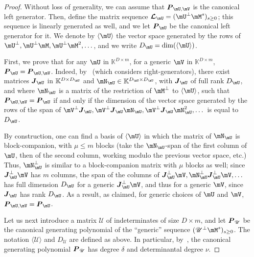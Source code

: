 \documentclass[12pt]{article}
\newcommand{\mat}[1]{\bm{\MakeUppercase{#1}}} %
\newcommand{\seqL}{\mat{\mathcal{L}}} %
\def\K{\mathbb{K}}
\def\K {\ensuremath{\mathbb{K}}}
\def\scrU {\ensuremath{\mathscr{U}}}
\begin{document}
\begin{proof}
  Without loss of generality, we can assume that $\mat{P}_{\mU,\mV}$
  is the canonical left generator. Then, define the matrix sequence
  $\seqL_{\mU} = (\mU^\perp\mM^s)_{s \ge 0}$; this sequence is
  linearly generated as well, and we let $\mat{P}_{\mU}$ be the
  canonical left generator for it.  We denote by $\langle \mU \rangle$
  the vector space generated by the rows of $\mU^\perp,\mU^\perp \mM,
  \mU^\perp{\mM^2},\dots$, and we write $D_\mU=\dim(\langle \mU
  \rangle)$.
	
  First, we prove that for any $\mU$ in $\K^{D \times m}$, for a
  generic $\mV$ in $\K^{D\times m}$,
  $\mat{P}_{\mU}=\mat{P}_{\mU,\mV}$.  Indeed,
  by~\cite[Lemma~4.2]{Villard97a} (which considers right-generators),
  there exist matrices $\mat{J}_\mU$ in $\K^{D\times D_\mU}$ and
  $\mN_\mU \in \K^{D_\mU \times D_\mU}$, with $\mat{J}_\mU$ of full
  rank $D_\mU$, and where $\mN_\mU$ is a matrix of the restriction of
  $\mM^\perp$ to $\langle \mU \rangle$, such that
  $\mat{P}_{\mU,\mV}=\mat{P}_{\mU}$ if and only if the dimension of
  the vector space generated by the rows of the span of
  $\mV^\perp\mat{J}_\mU, \mV^\perp \mat{J}_\mU \mN_\mU, \mV^\perp
  \mat{J}_\mU \mN_\mU^2,\dots$ is equal to $D_\mU$.
	
  By construction, one can find a basis of $\langle \mU \rangle$ in
  which the matrix of $\mN_\mU$ is block-companion, with $\mu \le m$
  blocks (take the $\mN_\mU$-span of the first column of $\mU$, then of
  the second column, working modulo the previous vector space, etc.)
  Thus, $\mN^\perp_\mU$ is similar to a block-companion matrix with $\mu$
  blocks as well; since $\mat{J}_\mU^\perp \mV$ has $m$ columns, the span of
  the columns of
  $\mat{J}_\mU^\perp \mV,  \mN^\perp_\mU\mat{J}_\mU^\perp \mV,\dots$
 has full dimension $D_\mU$ for a
  generic $\mat{J}_\mU^\perp \mV$, and thus for a generic $\mV$, since $\mat{J}_\mU$ has rank
  $D_\mU$. As a result, as claimed, for generic choices of $\mU$ and $\mV$,
  $\mat{P}_{\mU,\mV}=\mat{P}_{\mU}$.
	
  Let us next introduce a matrix $\scrU$ of indeterminates of size $D
  \times m$, and let $\mat{P}_{\scrU}$ be the canonical generating
  polynomial of the ``generic'' sequence $(\scrU^\perp \mM^s)_{s \ge
    0}$. The notation $\langle \scrU \rangle$ and $D_\scrU$ are
  defined as above.  In particular,
  by~\cite[Proposition~6.1]{Villard97a}, the canonical generating
  polynomial $\mat{P}_{\scrU}$ has degree $\delta$ and determinantal
  degree $\nu$.
  

\end{proof}
\end{document}

